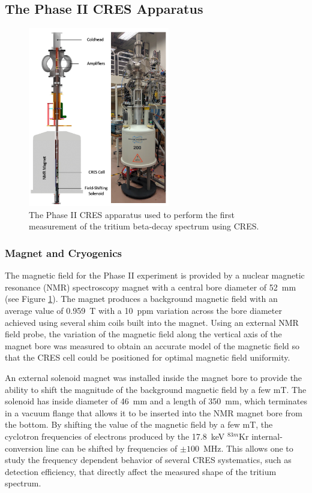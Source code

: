 \subsection{The Phase II CRES Apparatus}

\begin{figure}[htbp]
    \centering
    \includegraphics[width=0.55\textwidth]{figs/Chapter-3/phaseII_system.png}
    \caption{\label{fig:chap3-phase2-apparatus} The Phase II CRES apparatus used to perform the first measurement of the tritium beta-decay spectrum using CRES.}
\end{figure}

\subsubsection*{Magnet and Cryogenics}

The magnetic field for the Phase II experiment is provided by a nuclear magnetic resonance (NMR) spectroscopy magnet with a central bore diameter of 52~mm (see Figure \ref{fig:chap3-phase2-apparatus}). The magnet produces a background magnetic field with an average value of 0.959~T with a 10~ppm variation across the bore diameter achieved using several shim coils built into the magnet. Using an external NMR field probe, the variation of the magnetic field along the vertical axis of the magnet bore was measured to obtain an accurate model of the magnetic field so that the CRES cell could be positioned for optimal magnetic field uniformity.

An external solenoid magnet was installed inside the magnet bore to provide the ability to shift the magnitude of the background magnetic field by a few mT. The solenoid has inside diameter of 46~mm and a length of 350~mm, which terminates in a vacuum flange that allows it to be inserted into the NMR magnet bore from the bottom. By shifting the value of the magnetic field by a few mT, the cyclotron frequencies of electrons produced by the 17.8~keV $^{83m}$Kr internal-conversion line \cite{krypton83m} can be shifted by frequencies of $\pm100$~MHz. This allows one to study the frequency dependent behavior of several CRES systematics, such as detection efficiency, that directly affect the measured shape of the tritium spectrum. 

